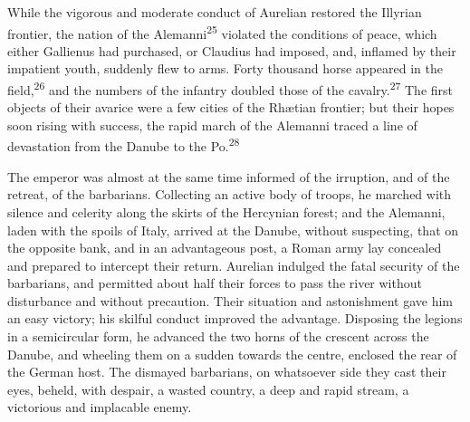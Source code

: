 

While the vigorous and moderate conduct of Aurelian restored the
Illyrian frontier, the nation of the Alemanni\textsuperscript{25} violated the
conditions of peace, which either Gallienus had purchased, or
Claudius had imposed, and, inflamed by their impatient youth,
suddenly flew to arms. Forty thousand horse appeared in the
field,\textsuperscript{26} and the numbers of the infantry doubled those of the
cavalry.\textsuperscript{27} The first objects of their avarice were a few cities
of the Rhætian frontier; but their hopes soon rising with
success, the rapid march of the Alemanni traced a line of
devastation from the Danube to the Po.\textsuperscript{28}





The emperor was almost at the same time informed of the
irruption, and of the retreat, of the barbarians. Collecting an
active body of troops, he marched with silence and celerity along
the skirts of the Hercynian forest; and the Alemanni, laden with
the spoils of Italy, arrived at the Danube, without suspecting,
that on the opposite bank, and in an advantageous post, a Roman
army lay concealed and prepared to intercept their return.
Aurelian indulged the fatal security of the barbarians, and
permitted about half their forces to pass the river without
disturbance and without precaution. Their situation and
astonishment gave him an easy victory; his skilful conduct
improved the advantage. Disposing the legions in a semicircular
form, he advanced the two horns of the crescent across the
Danube, and wheeling them on a sudden towards the centre,
enclosed the rear of the German host. The dismayed barbarians, on
whatsoever side they cast their eyes, beheld, with despair, a
wasted country, a deep and rapid stream, a victorious and
implacable enemy.

